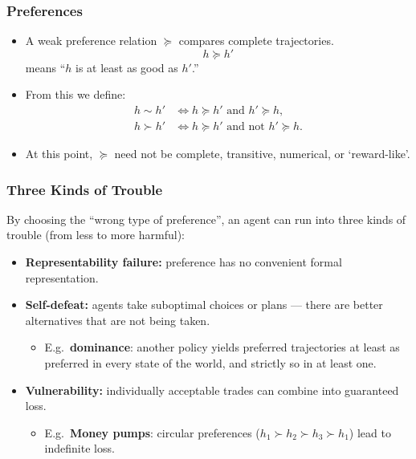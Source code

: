 \documentclass[10pt,a4paper]{beamer}
\newcommand{\pref}{\succcurlyeq}
\newcommand{\strictpref}{\succ}
\newcommand{\indiff}{\sim}
\newcommand{\exitem}{\item[$\triangleright$]}
\begin{document}
\begin{frame}
\frametitle{Preferences}
\begin{itemize}
    \item A weak preference relation $\pref$ compares complete trajectories.
    $$
    h\pref h'
    $$
    means ``$h$ is at least as good as $h'$.''
    \pause
    \item From this we define:
    \begin{align*}
        h \indiff h' &\iff h\pref h'\text{ and }h'\pref h,\\
        h \strictpref h' &\iff h\pref h'\text{ and not }h'\pref h.
    \end{align*}
    \pause
    \item At this point, $\pref$ need not be complete, transitive, numerical,
    or `reward-like'.
\end{itemize}
\end{frame}


\begin{frame}
\frametitle{Three Kinds of Trouble}
By choosing the ``wrong type of preference'', an agent can run into three kinds of trouble (from less to more harmful):
\vspace{0.4cm}
\begin{itemize}
    \item \textbf{Representability failure:}
    preference has no convenient formal representation.
    \pause
    \item \textbf{Self-defeat:}
    agents take suboptimal choices or plans --- there are better alternatives that are not being taken.
    \pause
    \begin{itemize}
        \exitem E.g.\ \textbf{dominance}: another policy yields preferred trajectories at least as preferred in every state of the world, and strictly so in at least one.
    \end{itemize}
    \pause
    \item \textbf{Vulnerability:}
    individually acceptable trades can combine into guaranteed loss.
    \begin{itemize}
        \exitem E.g.\ \textbf{Money pumps}: circular preferences ($h_1\strictpref h_2\strictpref h_3\strictpref h_1$) lead to indefinite loss.
    \end{itemize}
\end{itemize}
\end{frame}
\end{document}
